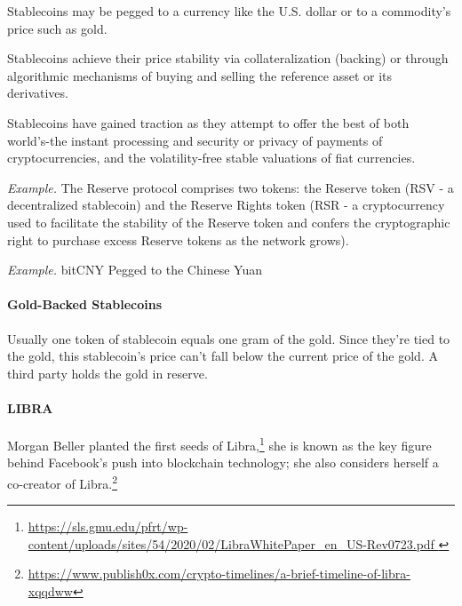 Stablecoins may be pegged to a currency like the U.S. dollar or to a commodity's price such as gold.

Stablecoins achieve their price stability via collateralization (backing) or through algorithmic mechanisms of buying and selling the reference asset or its derivatives.

Stablecoins have gained traction as they attempt to offer the best of both world's-the instant processing and security or privacy of payments of cryptocurrencies, and the volatility-free stable valuations of fiat currencies.

\emph{Example.} The Reserve protocol comprises two tokens: the Reserve token (RSV - a decentralized stablecoin) and the Reserve Rights token (RSR - a cryptocurrency used to facilitate the stability of the Reserve token and confers the cryptographic right to purchase excess Reserve tokens as the network grows).

\emph{Example.} bitCNY Pegged to the Chinese Yuan


\paragraph{Gold-Backed Stablecoins}
Usually one token of stablecoin equals one gram of the gold. Since they're tied to the gold, this stablecoin's price can't fall below the current price of the gold. A third party holds the gold in reserve.

\paragraph{LIBRA}

Morgan Beller planted the first seeds of Libra,\footnote{\url{https://sls.gmu.edu/pfrt/wp-content/uploads/sites/54/2020/02/LibraWhitePaper_en_US-Rev0723.pdf
}} she is known as the key figure behind Facebook's push into blockchain technology; she also considers herself a co-creator of Libra.\footnote{\url{https://www.publish0x.com/crypto-timelines/a-brief-timeline-of-libra-xqqdww}}

